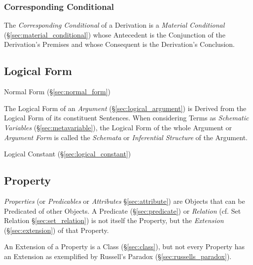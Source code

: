 \subsubsection{Corresponding Conditional}\label{sec:corresponding_conditional}

The \emph{Corresponding Conditional} of a Derivation is a
\emph{Material Conditional} (\S\ref{sec:material_conditional}) whose
Antecedent is the Conjunction of the Derivation's Premises and whose
Consequent is the Derivation's Conclusion.



\subsection{Logical Form}\label{sec:logical_form}

Normal Form (\S\ref{sec:normal_form})

The Logical Form of an \emph{Argument} (\S\ref{sec:logical_argument})
is Derived from the Logical Form of its constituent Sentences. When
considering Terms as \emph{Schematic Variables}
(\S\ref{sec:metavariable}), the Logical Form of the whole Argument or
\emph{Argument Form} is called the \emph{Schemata} or
\emph{Inferential Structure} of the Argument.



Logical Constant (\S\ref{sec:logical_constant})



\subsection{Property}\label{sec:property}

\emph{Properties} (or \emph{Predicables} or \emph{Attributes}
\S\ref{sec:attribute}) are Objects that can be Predicated of other
Objects. A Predicate (\S\ref{sec:predicate}) or \emph{Relation} (cf.
Set Relation \S\ref{sec:set_relation}) is not itself the Property, but
the \emph{Extension} (\S\ref{sec:extension}) of that Property.

An Extension of a Property is a Class (\S\ref{sec:class}), but not
every Property has an Extension as exemplified by Russell's Paradox
(\S\ref{sec:russells_paradox}).


